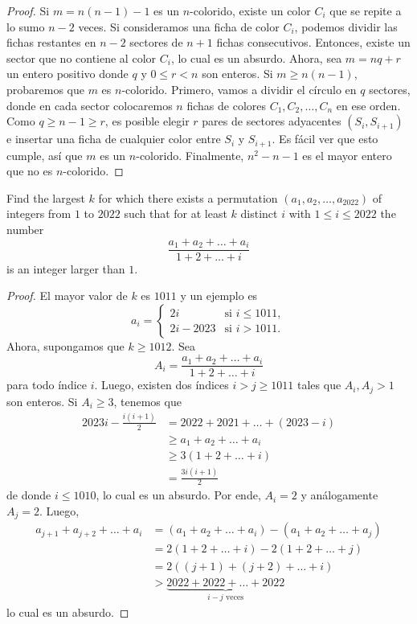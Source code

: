 \begin{proof}
	Si $m=n(n-1)-1$ es un $n$-colorido, existe un color $C_i$ que se repite a lo sumo $n-2$ veces. Si consideramos una ficha de color $C_i$, podemos dividir las fichas restantes en $n-2$ sectores de $n+1$ fichas consecutivos. Entonces, existe un sector que no contiene al color $C_i$, lo cual es un absurdo. Ahora, sea $m=nq+r$ un entero positivo donde $q$ y $0\le r<n$ son enteros. Si $m\ge n(n-1)$, probaremos que $m$ es $n$-colorido. Primero, vamos a dividir el círculo en $q$ sectores, donde en cada sector colocaremos $n$ fichas de colores $C_1,C_2,\dots,C_n$ en ese orden. Como $q\ge n-1\ge r$, es posible elegir $r$ pares de sectores adyacentes $(S_i,S_{i+1})$ e insertar una ficha de cualquier color entre $S_i$ y $S_{i+1}$. Es fácil ver que esto cumple, así que $m$ es un $n$-colorido. Finalmente, $n^2-n-1$ es el mayor entero que no es $n$-colorido.
\end{proof}

\begin{probEG}
	Find the largest $k$ for which there exists a permutation $(a_1,a_2,\dots,a_{2022})$ of integers from $1$ to $2022$ such that for at least $k$ distinct $i$ with $1\le i\le 2022$ the number
	\[\frac{a_1+a_2+\dots+a_i}{1+2+\dots+i}\]
	is an integer larger than $1$.
\end{probEG}

\begin{proof}
	El mayor valor de $k$ es $1011$ y un ejemplo es
	\[a_i=\begin{cases}
		2i&\text{si }i\le 1011,\\
		2i-2023&\text{si }i>1011.
	\end{cases}\]
	Ahora, supongamos que $k\ge 1012$. Sea
	\[A_i=\frac{a_1+a_2+\dots+a_i}{1+2+\dots+i}\]
	para todo índice $i$. Luego, existen dos índices $i>j\ge 1011$ tales que $A_i,A_j>1$ son enteros. Si $A_i\ge 3$, tenemos que
	\begin{align*}
		2023i-\frac{i(i+1)}{2}
		&=2022+2021+\dots+(2023-i)\\
		&\ge a_1+a_2+\dots+a_i\\
		&\ge 3(1+2+\dots+i)\\
		&=\frac{3i(i+1)}{2}
	\end{align*}
	de donde $i\le 1010$, lo cual es un absurdo. Por ende, $A_i=2$ y análogamente $A_j=2$. Luego,
	\begin{align*}
		a_{j+1}+a_{j+2}+\dots+a_i
		&=(a_1+a_2+\dots+a_i)-(a_1+a_2+\dots+a_j)\\
		&=2(1+2+\dots+i)-2(1+2+\dots+j)\\
		&=2((j+1)+(j+2)+\dots+i)\\
		&>\underbrace{2022+2022+\dots+2022}_{i-j\text{ veces}}
	\end{align*}
	lo cual es un absurdo.
\end{proof}

